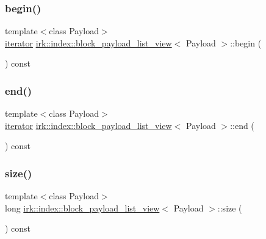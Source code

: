 \subsubsection{\texorpdfstring{begin()}{begin()}}
{\footnotesize\ttfamily template$<$class Payload$>$ \\
\mbox{\hyperlink{classirk_1_1index_1_1block__payload__list__view_a3cbb6ab331804c87e830be1380a3c2b2}{iterator}} \mbox{\hyperlink{classirk_1_1index_1_1block__payload__list__view}{irk\+::index\+::block\+\_\+payload\+\_\+list\+\_\+view}}$<$ Payload $>$\+::begin (\begin{DoxyParamCaption}{ }\end{DoxyParamCaption}) const\hspace{0.3cm}{\ttfamily [inline]}}

\mbox{\label{classirk_1_1index_1_1block__payload__list__view_a0daeb1ce7d6b877d6345067956dd8c9e}} 
\subsubsection{\texorpdfstring{end()}{end()}}
{\footnotesize\ttfamily template$<$class Payload$>$ \\
\mbox{\hyperlink{classirk_1_1index_1_1block__payload__list__view_a3cbb6ab331804c87e830be1380a3c2b2}{iterator}} \mbox{\hyperlink{classirk_1_1index_1_1block__payload__list__view}{irk\+::index\+::block\+\_\+payload\+\_\+list\+\_\+view}}$<$ Payload $>$\+::end (\begin{DoxyParamCaption}{ }\end{DoxyParamCaption}) const\hspace{0.3cm}{\ttfamily [inline]}}

\mbox{\label{classirk_1_1index_1_1block__payload__list__view_a39a195ac21c15a74c42c89f54dfbcbac}} 
\subsubsection{\texorpdfstring{size()}{size()}}
{\footnotesize\ttfamily template$<$class Payload$>$ \\
long \mbox{\hyperlink{classirk_1_1index_1_1block__payload__list__view}{irk\+::index\+::block\+\_\+payload\+\_\+list\+\_\+view}}$<$ Payload $>$\+::size (\begin{DoxyParamCaption}{ }\end{DoxyParamCaption}) const\hspace{0.3cm}{\ttfamily [inline]}}



